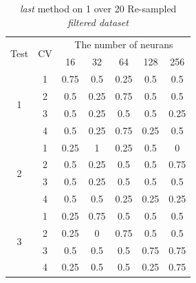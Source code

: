 \documentclass[draft,dvipsnames]{drexel-thesis}
\begin{document}
\begin{thesis}
\begin{table}[!t]
\centering
\caption{{\em last} method on 1 over 20 Re-sampled {\em filtered dataset}}
\label{tbl:last_1_20}
\begin{tabular}{|c|c|c|c|c|c|c|}
\hline
\multirow{2}{*}{Test} & \multirow{2}{*}{CV} & \multicolumn{5}{c|}{The number of neurans}                             \\ \cline{3-7} 
                      &                     & 16           & 32           & 64          & 128         & 256          \\ \hline
\multirow{4}{*}{1}    & 1                   & 0.75         & 0.5          & 0.25        & 0.5         & 0.5          \\ \cline{2-7} 
                      & 2                   & 0.5          & 0.25         & 0.75        & 0.5         & 0.5          \\ \cline{2-7} 
                      & 3                   & 0.5          & 0.25         & 0.5         & 0.5         & 0.25         \\ \cline{2-7} 
                      & 4                   & 0.5          & 0.25         & 0.75        & 0.25        & 0.5          \\ \hline
\multirow{4}{*}{2}    & 1                   & 0.25         & 1            & 0.25        & 0.5         & 0            \\ \cline{2-7} 
                      & 2                   & 0.5          & 0.25         & 0.5         & 0.5         & 0.75         \\ \cline{2-7} 
                      & 3                   & 0.5          & 0.25         & 0.5         & 0.5         & 0.5          \\ \cline{2-7} 
                      & 4                   & 0.5          & 0.5          & 0.25        & 0.25        & 0.25         \\ \hline
\multirow{4}{*}{3}    & 1                   & 0.25         & 0.75         & 0.5         & 0.5         & 0.5          \\ \cline{2-7} 
                      & 2                   & 0.25         & 0            & 0.75        & 0.5         & 0.5          \\ \cline{2-7} 
                      & 3                   & 0.5          & 0.5          & 0.5         & 0.75        & 0.75         \\ \cline{2-7} 
                      & 4                   & 0.25         & 0.5          & 0.5         & 0.25        & 0.75         \\ \hline

\end{tabular}
\end{table}
\end{thesis}
\end{document}
